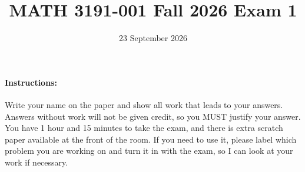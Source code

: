 \documentclass[12pt,addpoints,answers]{exam}
\title{MATH 3191-001 Fall 2026 Exam 1}
\date{23 September 2026}
\begin{document}
\maketitle

    \paragraph{Instructions:}

    Write your name on the paper and show all work that leads to your answers. Answers
    without work will not be given credit, so you MUST justify your answer. You
    have 1 hour and 15 minutes to take the exam, and there is extra scratch paper available at
    the front of the room. If you need to use it, please label which problem you are working on and
    turn it in with the exam, so I can look at your work if necessary.
\end{document}
